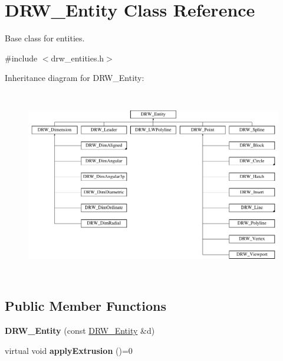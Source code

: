 \hypertarget{classDRW__Entity}{\section{D\-R\-W\-\_\-\-Entity Class Reference}
\label{classDRW__Entity}
}


Base class for entities.  




{\ttfamily \#include $<$drw\-\_\-entities.\-h$>$}

Inheritance diagram for D\-R\-W\-\_\-\-Entity\-:\begin{figure}[H]
\begin{center}
\leavevmode
\includegraphics[height=8.296296cm]{classDRW__Entity}
\end{center}
\end{figure}
\subsection*{Public Member Functions}
\begin{DoxyCompactItemize}
\item 
\hypertarget{classDRW__Entity_a2ba4ca83e25eca36822cdf4b0b332efe}{{\bfseries D\-R\-W\-\_\-\-Entity} (const \hyperlink{classDRW__Entity}{D\-R\-W\-\_\-\-Entity} \&d)}\label{classDRW__Entity_a2ba4ca83e25eca36822cdf4b0b332efe}

\item 
\hypertarget{classDRW__Entity_a202fefae9154ebddcf7f007af5517982}{virtual void {\bfseries apply\-Extrusion} ()=0}\label{classDRW__Entity_a202fefae9154ebddcf7f007af5517982}

\end{DoxyCompactItemize}
